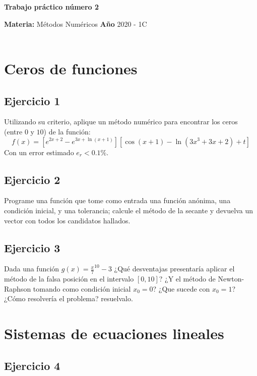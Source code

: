 \documentclass[a4paper, 11pt]{article}
\begin{document}
\renewcommand{\listtablename}{Índice de tablas} 
\renewcommand{\tablename}{Tabla}
\begin{center}
\LARGE \bf Trabajo práctico número 2
\end{center}

\vspace{1cm} 
\noindent\textbf{Materia:} M\'etodos Num\'ericos \hfill
\textbf{Año} 2020 - 1C \\
\hfill \\
\section*{Ceros de funciones}

\subsection*{Ejercicio 1}
Utilizando su criterio, aplique un método numérico para encontrar los ceros (entre $0$ y $10$) de la función:
$$f(x) = \left[ e^{2x+2} - e^{3x+\ln(x+1)}\right]\left[ \cos(x+1) - \ln(3x^3 +3x+2)+ t\right] $$
Con un error estimado $e_r <0.1\%$.

\subsection*{Ejercicio 2}
Programe una función que tome como entrada una función anónima, una condición inicial, y una tolerancia; calcule el método de la secante y devuelva un vector con todos los candidatos hallados. 

\subsection*{Ejercicio 3}
Dada una función $g(x) = \frac{x}{7}^{10} -3$ ¿Qué desventajas presentaría aplicar el método de la falsa posición en el intervalo $[0,10]$? ¿Y el método de Newton-Raphson tomando como condición inicial $x_0 = 0$? ¿Que sucede con $x_0 =1$? ¿Cómo resolvería el problema? resuelvalo.

\section*{Sistemas de ecuaciones lineales}

\subsection*{Ejercicio 4}
\end{document}
